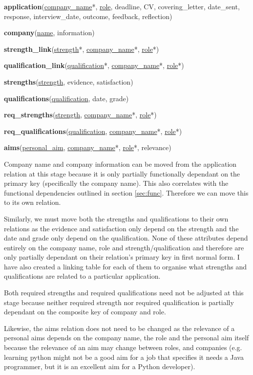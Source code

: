 \documentclass{article}
\begin{document}
\textbf{application}(\underline{company\_name}*, \underline{role}, deadline, CV, covering\_letter, date\_sent, response, interview\_date, outcome, feedback, reflection)

\textbf{company}(\underline{name}, information)

\textbf{strength\_link}(\underline{strength}*, \underline{company\_name}*, \underline{role}*)

\textbf{qualification\_link}(\underline{qualification}*, \underline{company\_name}*, \underline{role}*)

\textbf{strengths}(\underline{strength}, evidence, satisfaction)

\textbf{qualifications}(\underline{qualification}, date, grade)

\textbf{req\_strengths}(\underline{strength}, \underline{company\_name}*, \underline{role}*)

\textbf{req\_qualifications}(\underline{qualification}, \underline{company\_name}*, \underline{role}*)

\textbf{aims}(\underline{personal\_aim}, \underline{company\_name}*, \underline{role}*, relevance)

Company name and company information can be moved from the application relation at this stage because it is only partially functionally dependant on the primary key (specifically the company name). This also correlates with the functional dependencies outlined in section \ref{sec:func}. Therefore we can move this to its own relation.

Similarly, we must move both the strengths and qualifications to their own relations as the evidence and satisfaction only depend on the strength and the date and grade only depend on the qualification. None of these attributes depend entirely on the company name, role and strength/qualification and therefore are only partially dependant on their relation's primary key in first normal form. I have also created a linking table for each of them to organise what strengths and qualifications are related to a particular application.

Both required strengths and required qualifications need not be adjusted at this stage because neither required strength nor required qualification is partially dependant on the composite key of company and role. 

Likewise, the aims relation does not need to be changed as the relevance of a personal aims depends on the company name, the role and the personal aim itself because the relevance of an aim may change between roles, and companies (e.g. learning python might not be a good aim for a job that specifies it needs a Java programmer, but it is an excellent aim for a Python developer).
\end{document}
